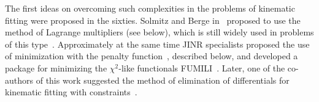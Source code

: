 
The first ideas on overcoming such complexities in the problems of kinematic fitting were proposed in the sixties.
Solmitz and Berge in~\cite{b1} proposed to use the method of Lagrange multipliers (see below), which is still widely used in problems of this type~\cite{b4}. %
Approximately at the same time JINR specialists proposed the use of minimization with the penalty function~\cite{b5}, described below, and developed a package for minimizing the $\chi^2$-like functionals FUMILI~\cite{fum_1st}.
Later, one of the co-authors of this work suggested the method of elimination of differentials for kinematic fitting with constraints~\cite{b6}.
